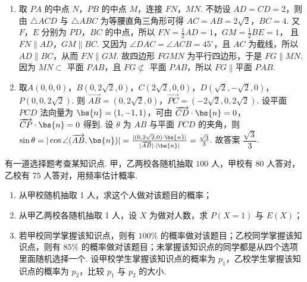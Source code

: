 \documentclass[UTF8,a4paper,oneside,11pt]{ctexbook}
\begin{document}
\begin{solution}
\begin{enumerate}
\item 取 \(PA\) 的中点 \(N\)，\(PB\) 的中点 \(M\)，连接 \(FN\)，\(MN\). 不妨设 \(AD=CD=2\)，则由 \(\triangle ACD\) 与 \(\triangle ABC\) 为等腰直角三角形可得 \(AC=AB=2\sqrt2\)，\(BC=4\). 又 \(F\)，\(E\) 分别为 \(PD\)，\(BC\) 的中点，所以 \(FN=\frac12 AD=1\)，\(GM=\frac12 BE=1\)，
且 \(FN\parallel AD\)，\(GM\parallel BC\). 又因为 \(\angle DAC=\angle ACB=45^\circ\)，且 \(AC\) 为截线，所以 \(AD\parallel BC\)，从而 \(FN\parallel GM\). 故四边形 \(FGMN\) 为平行四边形，于是
\(FG\parallel MN\). 因为 \(MN\subset\) 平面 \(PAB\)，且 \(FG\not\subset\) 平面 \(PAB\)，所以 \(FG\parallel \text{平面 }PAB\).

\item 取\(A(0,0,0)\)，\(B(0,2\sqrt2,0)\)，\(C(2\sqrt2,0,0)\)，\(D(\sqrt2,-\sqrt2,0)\)，\(P(0,0,2\sqrt2)\).
则 \(\overrightarrow{AB}=(0,2\sqrt2,0)\)，\(\overrightarrow{PC}=(-2\sqrt2,0,2\sqrt2)\). 设平面 \(PCD\) 法向量为 \(\bs{n}=(1,-1,1)\)，可由 \(\overrightarrow{CD}\cdot\bs{n}=0\)，\(\overrightarrow{CP}\cdot\bs{n}=0\) 得到. 设 \(\theta\) 为 \(AB\) 与平面 \(PCD\) 的夹角，则
\(\sin\theta=|\cos\angle(\overrightarrow{AB},\bs{n})|=\frac{|(0,2\sqrt2,0)\cdot\bs{n}|}{|\overrightarrow{AB}|\cdot|\bs{n}|}=\frac{\sqrt3}{3}\).
故答案 \(\dfrac{\sqrt3}{3}\).
\end{enumerate}
\end{solution}

\begin{problem}
有一道选择题考查某知识点. 甲，乙两校各随机抽取 \(100\) 人，甲校有 \(80\) 人答对，乙校有 \(75\) 人答对，用频率估计概率.

\begin{enumerate}
    \item 从甲校随机抽取 1 人，求这个人做对该题目的概率；
    \item 从甲乙两校各随机抽取 1 人，设 \(X\) 为做对人数，求 \(P(X=1)\) 与 \(E(X)\)；
    \item 若甲校同学掌握该知识点，则有 \(100\%\) 的概率做对该题目；乙校同学掌握该知识点，则有 \(85\%\) 的概率做对该题目；未掌握该知识点的同学都是从四个选项里面随机选择一个. 设甲校学生掌握该知识点的概率为 \(p_1\)，乙校学生掌握该知识点的概率为 \(p_2\)，比较 \(p_1\) 与 \(p_2\) 的大小.
\end{enumerate}
\end{problem}
\end{document}
